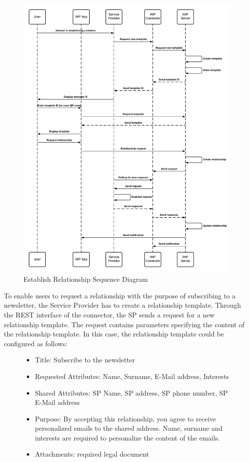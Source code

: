 \begin{figure}[H]
    \centering
    \includegraphics[scale=0.6]{Diagrams/IMP Use Case Establish Relationship Sequence Diagram.pdf}
    \caption{Establish Relationship Sequence Diagram}
    \label{imp:establish_relationship}
\end{figure}

To enable users to request a relationship with the purpose of subscribing to a newsletter, the Service Provider has to create a relationship template. Through the REST interface of the connector, the SP sends a request for a new relationship template. The request contains parameters specifying the content of the relationship template. In this case, the relationship template could be configured as follows:
\begin{figure}[H]
    \begin{itemize}
    \item Title: Subscribe to the newsletter
    \item Requested Attributes: Name, Surname, E-Mail address, Interests
    \item Shared Attributes: SP Name, SP address, SP phone number, SP E-Mail address
    \item Purpose: By accepting this relationship, you agree to receive personalized emails to the shared address. Name, surname and interests are required to personalize the content of the emails.
    \item Attachments: required legal document
\end{itemize}
\end{figure}


